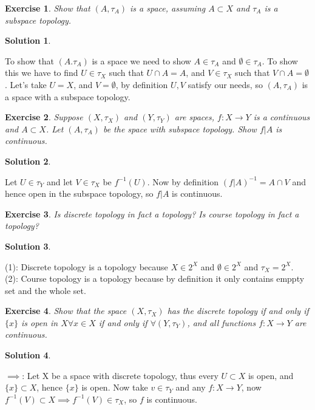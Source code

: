 \documentclass[11pt,a4paper]{article}
\newtheorem{Ex}{Exercise}
\newtheorem{Sol}{Solution}
\begin{document}
\begin{Ex}
	Show that $(A, \tau_A)$ is a space, assuming $A \subset X$ and $\tau_A$ is a subspace topology.
\end{Ex}

\begin{Sol} \end{Sol}
\noindent To show that $(A. \tau_A)$ is a space we need to show $A \in \tau_A$ and $\emptyset \in \tau_A$. To show this we have to find $U \in \tau_X$ such that $U \cap A = A$, and $V \in \tau_X$ such that $V \cap A = \emptyset$. Let's take $U = X$, and $V = \emptyset$, by definition $U,V$ satisfy our needs, so $(A , \tau_A)$ is a space with a subspace topology.

\begin{Ex}
	Suppose $(X, \tau_X)$ and $(Y, \tau_Y)$ are spaces, $f: X \rightarrow Y$ is a continuous and $A \subset X$. Let $(A, \tau_A)$ be the space with subspace topology. Show $f|A$ is continuous. 
\end{Ex}

\begin{Sol} \end{Sol}
\noindent Let $U \in \tau_Y$ and let $V \in \tau_X$ be $f^{-1}(U)$. Now by definition $(f|A)^{-1} = A \cap V$ and hence open in the subspace topology, so $f|A$ is continuous.

\begin{Ex}
	Is discrete topology in fact a topology? Is course topology in fact a topology?
\end{Ex}

\begin{Sol} \end{Sol}
\noindent (1): Discrete topology is a topology because $X \in 2^X$ and $\emptyset \in 2^X$ and $\tau_X = 2^X$. \\
\noindent (2): Course topology is a topology because by definition it only contains emppty set and the whole set.

\begin{Ex}
	Show that the space $(X, \tau_X)$ has the discrete topology if and only if $\{x\}$ is open in $X \forall x \in X$ if and only if $\forall (Y, \tau_Y)$, and all functions $f: X \rightarrow Y$ are continuous. 
\end{Ex}

\begin{Sol} \end{Sol}
\noindent $\implies$: Let X be a space with discrete topology, thus every $U \subset X$ is open, and $\{x\} \subset X$, hence $\{x\}$ is open. Now take $v \in \tau_Y$ and any $f : X \rightarrow Y$, now $f^{-1}(V) \subset X \implies f^{-1}(V) \in \tau_X$, so $f$ is continuous. \\
\end{document}
